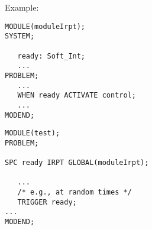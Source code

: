 Example:
\begin{multicols}{2}
\begin{lstlisting}
MODULE(moduleIrpt);
SYSTEM;         
        
   ready: Soft_Int; 
   ...            
PROBLEM;       
   ...            
   WHEN ready ACTIVATE control; 
   ...              
MODEND;            
\end{lstlisting}
\columnbreak
\begin{lstlisting}
MODULE(test);
PROBLEM;
     
SPC ready IRPT GLOBAL(moduleIrpt);

   ...
   /* e.g., at random times */
   TRIGGER ready;
... 
MODEND;
\end{lstlisting}
\end{multicols}

